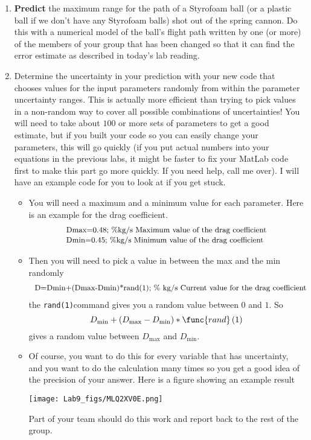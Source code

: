 \documentclass[twoside,11pt,ShortChapTitles]{BYUTextbook}
\begin{document}
\begin{enumerate}
\item \textbf{Predict} the maximum range for the path of a Styrofoam ball
(or a plastic ball if we don't have any Styrofoam balls) shot out of the
spring cannon. Do this with a numerical model of the ball's flight path
written by one (or more) of the members of your group that has been changed
so that it can find the error estimate as described in today's lab reading.

\item Determine the uncertainty in your prediction with your new code that
chooses values for the input parameters randomly from within the parameter
uncertainty ranges. This is actually more efficient than trying to pick
values in a non-random way to cover all possible combinations of
uncertainties! You will need to take about $100$ or more sets of parameters
to get a good estimate, but if you built your code so you can easily change
your parameters, this will go quickly (if you put actual numbers into your
equations in the previous labs, it might be faster to fix your MatLab code
first to make this part go more quickly. If you need help, call me over). I
will have an example code for you to look at if you get stuck.

\begin{itemize}
\item You will need a maximum and a minimum value for each parameter. Here
is an example for the drag coefficient.%
\[
\begin{tabular}{l}
{\small Dmax=0.48; \%kg/s Maximum value of the drag coefficient} \\ 
{\small Dmin=0.45; \%kg/s Minimum value of the drag coefficient}%
\end{tabular}%
\]

\item Then you will need to pick a value in between the max and the min
randomly%
\[
\begin{tabular}{l}
{\small D=Dmin+(Dmax-Dmin)*rand(1); \% kg/s Current value for the drag
coefficient}%
\end{tabular}%
\]%
the \texttt{rand(1)}command gives you a random value between $0$ and $1.$ So 
\[
D_{\min }+\left( D_{\max }-D_{\min }\right) \ast \func{rand}\left( 1\right) 
\]%
gives a random value between $D_{\max }$ and $D_{\min }.$

\item Of course, you want to do this for every variable that has
uncertainty, and you want to do the calculation many times so you get a good
idea of the precision of your answer. Here is a figure showing an example
result
\begin{center}
\texttt{[image: Lab9\_figs/MLQ2XV0E.png]}
\end{center}
Part of your team should do this
work and report back to the rest of the group.
\end{itemize}


\end{enumerate}
\end{document}
